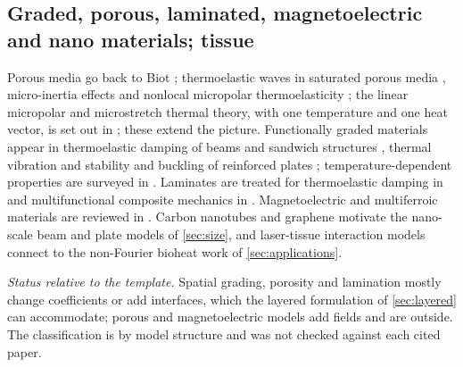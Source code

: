 \subsection{Graded, porous, laminated, magnetoelectric and nano materials; tissue}
Porous media go back to Biot \cite{Biot1941}; thermoelastic waves in saturated porous media \cite{Zorammuana2015}, micro-inertia effects \cite{SinghLianngenga2017} and nonlocal micropolar thermoelasticity \cite{Kalkal2020Refl}; the linear micropolar and microstretch thermal theory, with one temperature and one heat vector, is set out in \cite{Eringen1999}; these extend the picture. Functionally graded materials \cite{SureshMortensen1997} appear in thermoelastic damping of beams and sandwich structures \cite{Zhong2017,Peng2023}, thermal vibration and stability \cite{Fazzolari2018} and buckling of reinforced plates \cite{Meng2026}; temperature-dependent properties are surveyed in \cite{Noda1991}. Laminates are treated for thermoelastic damping in \cite{Vengallatore2005} and multifunctional composite mechanics in \cite{Gibson2010}. Magnetoelectric and multiferroic materials are reviewed in \cite{Eerenstein2006,Nan2008}. Carbon nanotubes and graphene \cite{Iijima1991,Lee2008} motivate the nano-scale beam and plate models of \cref{sec:size}, and laser-tissue interaction models \cite{Pearce2011,Li2026Bio} connect to the non-Fourier bioheat work of \cref{sec:applications}.

\emph{Status relative to the template.} Spatial grading, porosity and lamination mostly change coefficients or add interfaces, which the layered formulation of \cref{sec:layered} can accommodate; porous and magnetoelectric models add fields and are outside. The classification is by model structure and was not checked against each cited paper.

